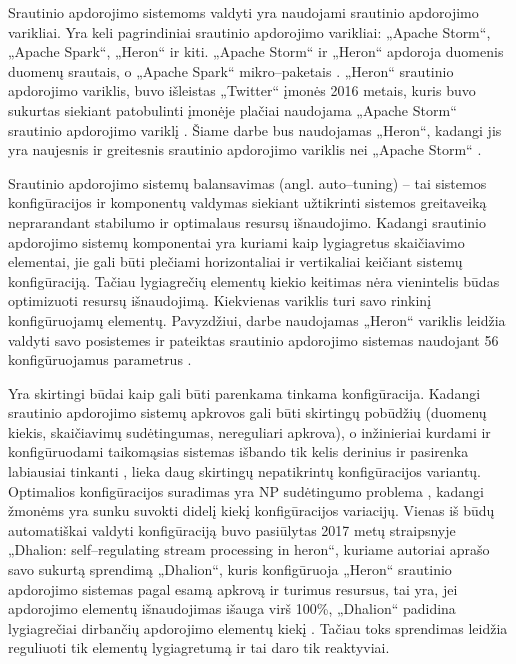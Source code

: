 \documentclass{VUMIFPSbakalaurinis}
\begin{document}
Srautinio apdorojimo sistemoms valdyti yra naudojami srautinio apdorojimo varikliai. Yra keli pagrindiniai srautinio apdorojimo varikliai: „Apache Storm“, „Apache Spark“, „Heron“ ir kiti. „Apache Storm“ ir „Heron“ apdoroja duomenis duomenų srautais, o „Apache Spark“ mikro–paketais \cite{karau2015learning}. „Heron“ srautinio apdorojimo variklis, buvo išleistas „Twitter“ įmonės 2016 metais, kuris buvo sukurtas siekiant patobulinti įmonėje plačiai naudojama „Apache Storm“ srautinio apdorojimo variklį \cite{openSourcing}. Šiame darbe bus naudojamas „Heron“, kadangi jis yra naujesnis ir greitesnis srautinio apdorojimo variklis nei „Apache Storm“ \cite{twitterHeron}. 

Srautinio apdorojimo sistemų balansavimas (angl. auto–tuning) – tai sistemos konfigūracijos ir komponentų valdymas siekiant užtikrinti sistemos greitaveiką neprarandant stabilumo ir optimalaus resursų išnaudojimo. Kadangi srautinio apdorojimo sistemų komponentai yra kuriami kaip lygiagretus skaičiavimo elementai, jie gali būti plečiami horizontaliai ir vertikaliai \cite{shortstreamproc} keičiant sistemų konfigūraciją. Tačiau lygiagrečių elementų kiekio keitimas nėra vienintelis būdas optimizuoti resursų išnaudojimą. Kiekvienas variklis turi savo rinkinį konfigūruojamų elementų. Pavyzdžiui, darbe naudojamas „Heron“ variklis leidžia valdyti savo posistemes ir pateiktas srautinio apdorojimo sistemas naudojant 56 konfigūruojamus parametrus \cite{configDocument}.

Yra skirtingi būdai kaip gali būti parenkama tinkama konfigūracija. Kadangi srautinio apdorojimo sistemų apkrovos gali būti skirtingų pobūdžių (duomenų kiekis, skaičiavimų sudėtingumas, nereguliari apkrova), o inžinieriai kurdami ir konfigūruodami taikomąsias sistemas išbando tik kelis derinius ir pasirenka labiausiai tinkanti \cite{selfRegulatingStreaming}, lieka daug skirtingų nepatikrintų konfigūracijos variantų. Optimalios konfigūracijos suradimas yra NP sudėtingumo problema \cite{automateTuning}, kadangi žmonėms yra sunku suvokti didelį kiekį konfigūracijos variacijų. 
Vienas iš būdų automatiškai valdyti konfigūraciją buvo pasiūlytas 2017 metų straipsnyje „Dhalion: self–regulating stream processing in heron“, kuriame autoriai aprašo savo sukurtą sprendimą „Dhalion“, kuris konfigūruoja „Heron“ srautinio apdorojimo sistemas pagal esamą apkrovą ir turimus resursus, tai yra, jei apdorojimo elementų išnaudojimas išauga virš 100\%, „Dhalion“ padidina lygiagrečiai dirbančių apdorojimo elementų kiekį \cite{dhalion}. Tačiau toks sprendimas leidžia reguliuoti tik elementų lygiagretumą ir tai daro tik reaktyviai.
\end{document}
